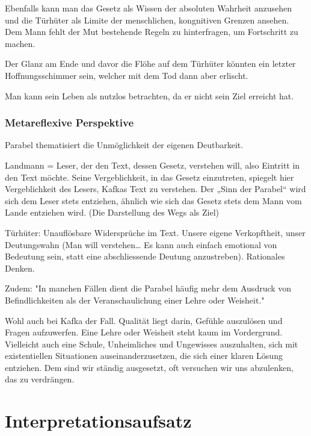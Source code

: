 \documentclass{article}
\begin{document}
Ebenfalls kann man das Gesetz als Wissen der absoluten Wahrheit anzusehen und die Türhüter als Limite der menschlichen, kongnitiven Grenzen ansehen. Dem Mann fehlt der Mut bestehende Regeln zu hinterfragen, um Fortschritt zu machen.

Der Glanz am Ende und davor die Flöhe auf dem Türhüter könnten ein letzter Hoffnungsschimmer sein, welcher mit dem Tod dann aber erlischt.

Man kann sein Leben als nutzlos betrachten, da er nicht sein Ziel erreicht hat.

\section{Metareflexive Perspektive}
Parabel thematisiert die Unmöglichkeit der eigenen Deutbarkeit. 

Landmann = Leser, der den Text, dessen Gesetz, verstehen will, also Eintritt in den Text möchte. Seine Vergeblichkeit, in das Gesetz einzutreten, spiegelt hier Vergeblichkeit des Lesers, Kafkas Text zu verstehen. Der „Sinn der Parabel“ wird sich dem Leser stets entziehen, ähnlich wie sich das Gesetz stets dem Mann vom Lande entziehen wird. (Die Darstellung des Wegs als Ziel)

Türhüter: Unauflösbare Widersprüche im Text. Unsere eigene Verkopftheit, unser Deutungswahn (Man will verstehen… Es kann auch einfach emotional von Bedeutung sein, statt eine abschliessende Deutung anzustreben). Rationales Denken.
 
Zudem: "In manchen Fällen dient die Parabel häufig mehr dem Ausdruck von Befindlichkeiten als der Veranschaulichung einer Lehre oder Weisheit." 
 
Wohl auch bei Kafka der Fall. Qualität liegt darin, Gefühle auszulösen und Fragen aufzuwerfen. Eine Lehre oder Weisheit steht kaum im Vordergrund. Vielleicht auch eine Schule, Unheimliches und Ungewisses auszuhalten, sich mit existentiellen Situationen auseinanderzusetzen, die sich einer klaren Lösung entziehen. Dem sind wir ständig ausgesetzt, oft versuchen wir uns abzulenken, das zu verdrängen.

\newpage
\part{Interpretationsaufsatz}
\end{document}
